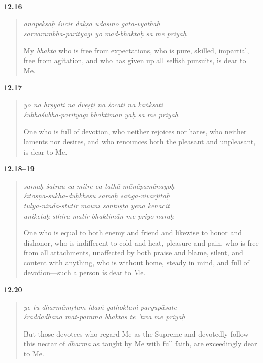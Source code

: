 \par\noindent\textbf{12.16}\par
\begin{verse}
\textit{anapekṣaḥ śucir dakṣa udāsīno gata-vyathaḥ} \\
\textit{sarvārambha-parityāgī yo mad-bhaktaḥ sa me priyaḥ}

\noindent My \textit{bhakta} who is free from expectations, who is pure, skilled, impartial, free from agitation, and who has given up all selfish pursuits, is dear to Me.
\end{verse}
\par



\par\noindent\textbf{12.17}\par
\begin{verse}
\textit{yo na hṛṣyati na dveṣṭi na śocati na kāṅkṣati} \\
\textit{śubhāśubha-parityāgī bhaktimān yaḥ sa me priyaḥ}

\noindent One who is full of devotion, who neither rejoices nor hates, who neither laments nor desires, and who renounces both the pleasant and unpleasant, is dear to Me.
\end{verse}
\par



\par\noindent\textbf{12.18–19}\par
\begin{verse}
\textit{samaḥ śatrau ca mitre ca tathā mānāpamānayoḥ} \\
\textit{śītoṣṇa-sukha-duḥkheṣu samaḥ saṅga-vivarjitaḥ} \\
\textit{tulya-nindā-stutir maunī santuṣṭo yena kenacit} \\
\textit{aniketaḥ sthira-matir bhaktimān me priyo naraḥ}

\noindent One who is equal to both enemy and friend and likewise to honor and dishonor, who is indifferent to cold and heat, pleasure and pain, who is free from all attachments, unaffected by both praise and blame, silent, and content with anything, who is without home, steady in mind, and full of devotion---such a person is dear to Me.
\end{verse}
\par



\par\noindent\textbf{12.20}\par
\begin{verse}
\textit{ye tu dharmāmṛtam idaṁ yathoktaṁ paryupāsate} \\
\textit{śraddadhānā mat-paramā bhaktās te ’tīva me priyāḥ}

\noindent But those devotees who regard Me as the Supreme and devotedly follow this nectar of \textit{dharma} as taught by Me with full faith, are exceedingly dear to Me.
\end{verse}
\par


